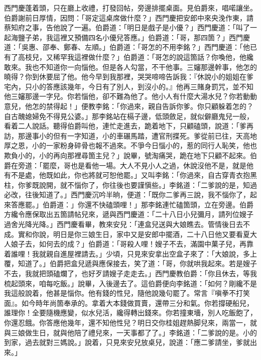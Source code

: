 西門慶蓬着頭，只在廳上收禮，打發回帖，旁邊排擺桌面。見伯爵來，唱喏讓坐。伯爵謝前日厚情，因問：「哥定這桌席做什麼？」西門慶把安郎中來央浼作東，請蔡知府之事，告他說了一遍。伯爵道：「明日是戲子是小優？」西門慶道：「叫了一起海鹽子弟，我這裡又預備四名小優兒答應。」伯爵道：「哥，那四箇？」{}西門慶道：「吳惠、邵奉、鄭春、左順。」伯爵道：「哥怎的不用李銘？」西門慶道：「他已有了高枝兒，又稀罕我這裡做什麼？」伯爵道：「哥怎的說這箇話？你喚他，他纔敢來。我也不知道你一向惱他。但是各人勾當，不干他事。三嬸那邊幹事，他怎的曉得？你到休要屈了他。他今早到我那裡，哭哭啼啼告訴我：『休說小的姐姐在爹宅內，只小的答應該幾年，今日有了別人，到沒小的。』他再三賭身罰咒，並不知他三嬸那邊一字兒。你若惱他，卻不難為他了。他小人有什麼大湯水兒？你若動動意兒，他怎的禁得起！」便教李銘：「你過來，親自告訴你爹。你只顧躲着怎的？自古醜媳婦免不得見公婆。」那李銘站在槅子邊，低頭斂足，就似僻廳鬼兒一般，看着二人說話。聽得伯爵叫他，連忙走進去，跪着地下，只顧磕頭，說道：「爹再訪，那邊事小的但有一字知道，小的車碾馬踏，遭官刑揲死。爹從前已往，天高地厚之恩，小的一家粉身碎骨也報不過來。不爭今日惱小的，惹的同行人恥笑，他也欺負小的，小的再向那裡尋箇主兒？」說畢，號淘痛哭，跪在地下只顧不起來。伯爵在旁道：「罷麼，哥也是看他一場。大人不見小人之過，休說沒他不是，就是他有不是處，他既如此，你也將就可恕他罷。」又叫李銘：「你過來，自古穿青衣抱黑柱，你爹既說開，就不惱你了，你往後也要謹愼些。」李銘道：「二爹說的是，知過必改，往後知道了。」西門慶沉吟半晌，便道：「既你二爹再三說，我不惱你了，起來答應罷。」伯爵道：」你還不快磕頭哩！」那李銘連忙磕箇頭，立在旁邊。伯爵方纔令應保取出五箇請帖兒來，遞與西門慶道：「二十八日小兒彌月，請列位嫂子過舍光降光降。」西門慶看畢，教來安兒：「連盒兒送與大娘瞧去。管情後日去不成。實和你說，明日是你三娘生日，家中又是安郎中擺酒，二十八日他又要看夏大人娘子去，如何去的成？」伯爵道：「哥殺人哩！嫂子不去，滿園中菓子兒，再靠着誰哩！我就親自進屋裡請去。」{}少頃，只見來安拿出空盒子來了：「大娘說，多上覆，知道了。」伯爵把盒兒遞與應保接去，笑了道：「哥，你就哄我起來。若是嫂子不去，我就把頭磕爛了，也好歹請嫂子走走去。」西門慶教伯爵：「你且休去，等我梳起頭來，咱每吃飯。」說畢，入後邊去了。這伯爵便向李銘道：「如何？剛纔不是我這般說着，他甚是惱你。他有錢的性兒，隨他說幾句罷了。常言『嗔拳不打笑面』。如今時年尚箇奉承的。拿着大本錢做買賣，還帶三分和氣。你若撐硬船兒，誰理你！全要隨機應變，似水兒活，纔得轉出錢來。你若撞東墻，別人吃飯飽了，你還忍餓。{}你答應他幾年，還不知他性兒？明日交你桂姐趕熱脚兒來，兩當一，就與三娘做生日，就與他陪了禮兒來，一天事都了了。」李銘道：「二爹說的是。小的到家，過去就對三媽說。」說着，只見來安兒放桌兒，說道：「應二爹請坐，爹就出來。」

